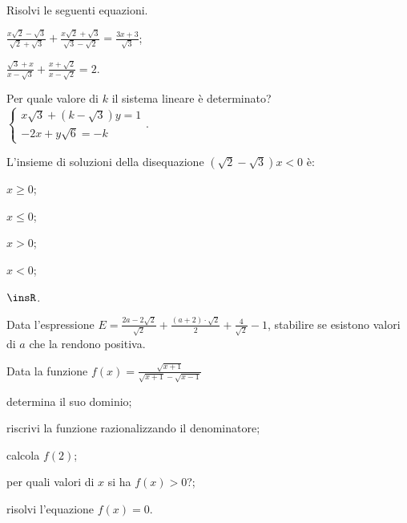 \begin{esercizio}[\Ast]%
Risolvi le seguenti equazioni.
\begin{multicols}{2}
 \begin{enumeratea}
 \item $\frac{x\sqrt 2-\sqrt 3}{\sqrt 2+\sqrt 3}+\frac{x\sqrt 2+\sqrt 3}{\sqrt 3-\sqrt 2}=\frac{3x+3}{\sqrt 3}$;
 \item $\frac{\sqrt 3+x}{x-\sqrt 3}+\frac{x+\sqrt 2}{x-\sqrt 2}=2$.
 \end{enumeratea}
\end{multicols}
\end{esercizio}

\begin{esercizio}%
Per quale valore di $k$ il sistema lineare è determinato?
$\left\{\begin{array}{l}{x\sqrt 3+(k-\sqrt 3)y=1}\\
 {-2x+y\sqrt 6=-k} \end{array}\right..$
\end{esercizio}

\begin{esercizio}%
L’insieme di soluzioni della disequazione $(\sqrt 2-\sqrt 3)x<0$ è:
\begin{multicols}{5}
 \begin{enumeratea}
 \item $x\ge 0$;
 \item $x\le 0$;
 \item $x>0$;
 \item $x<0$;
 \item $\insR$.
 \end{enumeratea}
\end{multicols}
\end{esercizio}

\begin{esercizio}%
Data l'espressione $E=\frac{2a-2\sqrt 2}{\sqrt 2}+\frac{(a+2)\cdot \sqrt 2} 2+\frac 4{\sqrt 2}-1$, stabilire se esistono valori di $a$ che la rendono positiva.
\end{esercizio}

\begin{esercizio}%
Data la funzione $f(x)=\frac{\sqrt{x+1}}{\sqrt{x+1}-\sqrt{x-1}}$
 \begin{enumeratea}
 \item determina il suo dominio;
 \item riscrivi la funzione razionalizzando il denominatore;
 \item calcola $f(2)$;
 \item per quali valori di $x$ si ha $f(x)>0$?;
 \item risolvi l'equazione $f(x)=0$.
 \end{enumeratea}
\end{esercizio}



